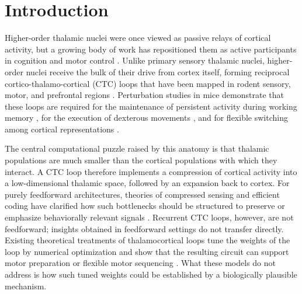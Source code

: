 
\section{Introduction}

Higher-order thalamic nuclei were once viewed as passive relays of cortical
activity, but a growing body of work has repositioned them as active
participants in cognition and motor control \cite{sherman2007thalamic,
sherman2016thalamus, halassa2019thalamocortical}. Unlike primary sensory
thalamic nuclei, higher-order nuclei receive the bulk of their drive from
cortex itself, forming reciprocal cortico-thalamo-cortical (CTC) loops that
have been mapped in rodent sensory, motor, and prefrontal regions
\cite{yamawaki2015synaptic, economo2018distinct, collins2018reciprocal,
guo2018anterolateral}. Perturbation studies in mice demonstrate that these
loops are required for the maintenance of persistent activity during working
memory \cite{guo2017maintenance, bolkan2017thalamic, schmitt2017thalamic},
for the execution of dexterous movements \cite{sauerbrei2020cortical}, and
for flexible switching among cortical representations
\cite{rikhye2018thalamic, alcaraz2018thalamocortical}.

The central computational puzzle raised by this anatomy is that thalamic
populations are much smaller than the cortical populations with which they
interact. A CTC loop therefore implements a compression of cortical
activity into a low-dimensional thalamic space, followed by an expansion
back to cortex. For purely feedforward architectures, theories of
compressed sensing and efficient coding have clarified how such bottlenecks
should be structured to preserve or emphasize behaviorally relevant signals
\cite{ganguli2012compressed, olshausen1996emergence}. Recurrent CTC loops,
however, are not feedforward; insights obtained in feedforward settings do
not transfer directly. Existing theoretical treatments of thalamocortical
loops tune the weights of the loop by numerical optimization and show that
the resulting circuit can support motor preparation or flexible motor
sequencing \cite{kao2021optimal, logiaco2021thalamic}. What these models do
not address is how such tuned weights could be established by a
biologically plausible mechanism.

